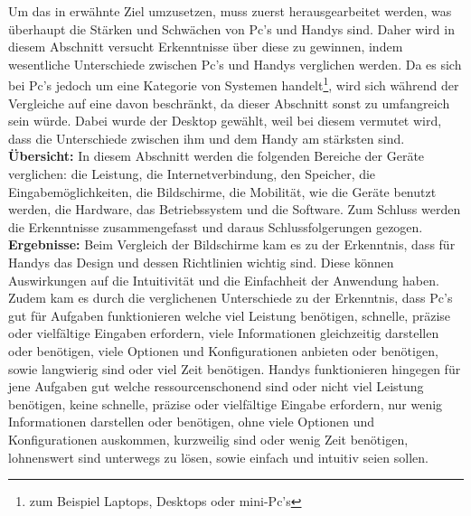 \myCheckmark%
%
	Um das in  erwähnte Ziel umzusetzen, muss zuerst herausgearbeitet werden, was überhaupt die Stärken und Schwächen von Pc's und Handys sind. %
	Daher wird in diesem Abschnitt versucht Erkenntnisse über diese zu gewinnen, indem wesentliche Unterschiede zwischen Pc's und Handys verglichen werden. %
	Da es sich bei Pc’s jedoch um eine Kategorie von Systemen handelt\footnote{zum Beispiel Laptops, Desktops oder mini-Pc's}, wird sich während der Vergleiche auf eine davon beschränkt, da dieser Abschnitt sonst zu umfangreich sein würde. Dabei wurde der Desktop gewählt, weil bei diesem vermutet wird, dass die Unterschiede zwischen ihm und dem Handy am stärksten sind. \newline%
\textbf{Übersicht:} %
	In diesem Abschnitt werden die folgenden Bereiche der Geräte verglichen: die Leistung, die Internetverbindung, den Speicher, die Eingabemöglichkeiten, die Bildschirme, die Mobilität, wie die Geräte benutzt werden, die Hardware, das Betriebssystem und die Software. %
	Zum Schluss werden die Erkenntnisse zusammengefasst und daraus Schlussfolgerungen gezogen.\newline%
\textbf{Ergebnisse:} %
	Beim Vergleich der Bildschirme kam es zu der Erkenntnis, dass für Handys das Design und dessen Richtlinien wichtig sind. Diese können Auswirkungen auf die Intuitivität und die Einfachheit der Anwendung haben.\newline%
	Zudem kam es durch die verglichenen Unterschiede zu der Erkenntnis, dass Pc's gut für Aufgaben funktionieren welche\myTodo %
		viel Leistung benötigen, schnelle, präzise oder vielfältige Eingaben erfordern, viele Informationen gleichzeitig darstellen oder benötigen, viele Optionen und Konfigurationen anbieten oder benötigen, sowie langwierig sind oder viel Zeit benötigen. %
	Handys funktionieren hingegen für jene Aufgaben gut welche\myTodo %
		ressourcenschonend sind oder nicht viel Leistung benötigen, keine schnelle, präzise oder vielfältige Eingabe erfordern, nur wenig Informationen darstellen oder benötigen, ohne viele Optionen und Konfigurationen auskommen, kurzweilig sind oder wenig Zeit benötigen, lohnenswert sind unterwegs zu lösen, sowie einfach und intuitiv seien sollen.